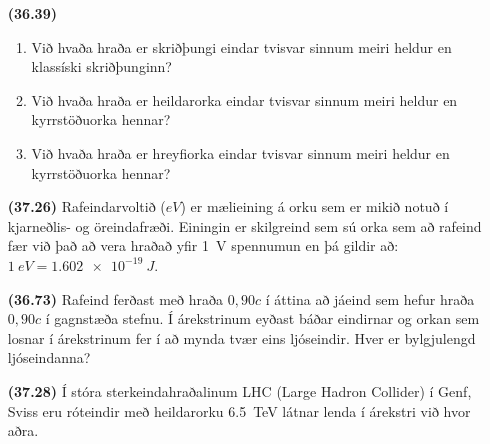 \begin{enumerate}[label = \textbf{(\alph*)}]

\item[\textbf{(36.39)}] \begin{enumerate}[label = \textbf{(\alph*)}]
    \item Við hvaða hraða er skriðþungi eindar tvisvar sinnum meiri heldur en klassíski skriðþunginn?
    \item Við hvaða hraða er heildarorka eindar tvisvar sinnum meiri heldur en kyrrstöðuorka hennar?
    \item Við hvaða hraða er hreyfiorka eindar tvisvar sinnum meiri heldur en kyrrstöðuorka hennar?

\end{enumerate}

\item[\textbf{(37.26)}] Rafeindarvoltið ($\si{eV}$) er mælieining á orku sem er mikið notuð í kjarneðlis- og öreindafræði. Einingin er skilgreind sem sú orka sem að rafeind fær við það að vera hraðað yfir \SI{1}{V} spennumun en þá gildir að: $\SI{1}{eV} = \SI{1.602e-19}{J}$.

\item[\textbf{(36.73)}] Rafeind ferðast með hraða $0,90c$ í áttina að jáeind sem hefur hraða $0,90c$ í gagnstæða stefnu. Í árekstrinum eyðast báðar eindirnar og orkan sem losnar í árekstrinum fer í að mynda tvær eins ljóseindir. Hver er bylgjulengd ljóseindanna?

\item[\textbf{(37.28)}] Í stóra sterkeindahraðalinum LHC (Large Hadron Collider) í Genf, Sviss eru róteindir með heildarorku \SI{6.5}{TeV} látnar lenda í árekstri við hvor aðra.  

\end{enumerate}

